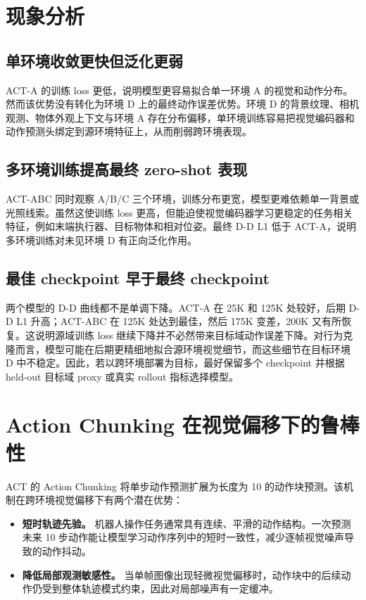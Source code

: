 \documentclass[11pt,a4paper]{ctexart}
\begin{document}
\section{现象分析}
\subsection{单环境收敛更快但泛化更弱}
ACT-A 的训练 loss 更低，说明模型更容易拟合单一环境 A 的视觉和动作分布。然而该优势没有转化为环境 D 上的最终动作误差优势。环境 D 的背景纹理、相机观测、物体外观上下文与环境 A 存在分布偏移，单环境训练容易把视觉编码器和动作预测头绑定到源环境特征上，从而削弱跨环境表现。

\subsection{多环境训练提高最终 zero-shot 表现}
ACT-ABC 同时观察 A/B/C 三个环境，训练分布更宽，模型更难依赖单一背景或光照线索。虽然这使训练 loss 更高，但能迫使视觉编码器学习更稳定的任务相关特征，例如末端执行器、目标物体和相对位姿。最终 D-D L1 低于 ACT-A，说明多环境训练对未见环境 D 有正向泛化作用。

\subsection{最佳 checkpoint 早于最终 checkpoint}
两个模型的 D-D 曲线都不是单调下降。ACT-A 在 25K 和 125K 处较好，后期 D-D L1 升高；ACT-ABC 在 125K 处达到最佳，然后 175K 变差，200K 又有所恢复。这说明源域训练 loss 继续下降并不必然带来目标域动作误差下降。对行为克隆而言，模型可能在后期更精细地拟合源环境视觉细节，而这些细节在目标环境 D 中不稳定。因此，若以跨环境部署为目标，最好保留多个 checkpoint 并根据 held-out 目标域 proxy 或真实 rollout 指标选择模型。

\section{Action Chunking 在视觉偏移下的鲁棒性}
ACT 的 Action Chunking 将单步动作预测扩展为长度为 10 的动作块预测。该机制在跨环境视觉偏移下有两个潜在优势：
\begin{itemize}
  \item \textbf{短时轨迹先验。} 机器人操作任务通常具有连续、平滑的动作结构。一次预测未来 10 步动作能让模型学习动作序列中的短时一致性，减少逐帧视觉噪声导致的动作抖动。
  \item \textbf{降低局部观测敏感性。} 当单帧图像出现轻微视觉偏移时，动作块中的后续动作仍受到整体轨迹模式约束，因此对局部噪声有一定缓冲。
\end{itemize}
\end{document}
